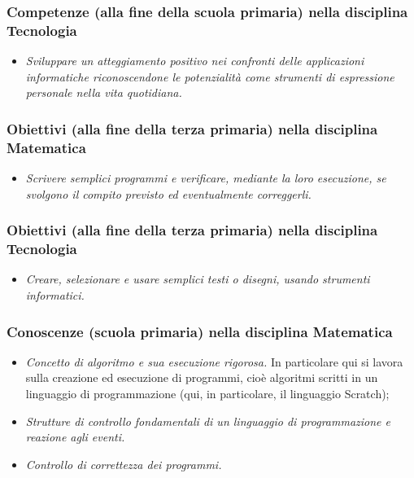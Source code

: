 \subsubsection{Competenze (alla fine della scuola primaria) nella disciplina Tecnologia}


\begin{itemize}
\item
  \emph{Sviluppare un atteggiamento positivo nei confronti delle applicazioni informatiche riconoscendone le potenzialità come strumenti di espressione personale nella vita quotidiana.}
\end{itemize}



\subsubsection{Obiettivi (alla fine della terza primaria) nella disciplina Matematica}


\begin{itemize}
\item
  \emph{Scrivere semplici programmi e verificare, mediante la loro esecuzione, se svolgono il compito previsto ed eventualmente correggerli.}
\end{itemize}


\subsubsection{Obiettivi (alla fine della terza primaria) nella disciplina Tecnologia}


\begin{itemize}
\item
  \emph{Creare, selezionare e usare semplici testi o disegni, usando strumenti informatici.}
\end{itemize}



\subsubsection{Conoscenze (scuola primaria) nella disciplina Matematica}


\begin{itemize}
\item
  \emph{Concetto di algoritmo e sua esecuzione rigorosa.} In particolare qui si lavora sulla creazione ed esecuzione di programmi, cioè algoritmi scritti in un linguaggio di programmazione (qui, in particolare, il linguaggio Scratch);
\item
  \emph{Strutture di controllo fondamentali di un linguaggio di programmazione e reazione agli eventi.}
\item
  \emph{Controllo di correttezza dei programmi.}
\end{itemize}

